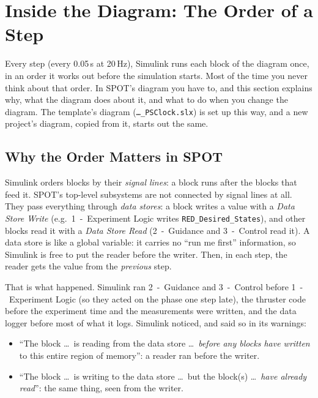 \documentclass[11pt,a4paper]{article}
\newcommand{\pth}[1]{\texttt{#1}}
\newcommand{\fn}[1]{\texttt{#1}}
\begin{document}
\section{Inside the Diagram: The Order of a Step}\label{sec:order}

Every step (every 0.05\,s at 20\,Hz), Simulink runs each block of the diagram once, in an order it works out
before the simulation starts. Most of the time you never think about that order. In SPOT's diagram you have to,
and this section explains why, what the diagram does about it, and what to do when you change the diagram.
The template's diagram (\pth{\ldots\_PSClock.slx}) is set up this way, and a new project's diagram, copied
from it, starts out the same.

\subsection{Why the Order Matters in SPOT}
Simulink orders blocks by their \emph{signal lines}: a block runs after the blocks that feed it. SPOT's
top-level subsystems are not connected by signal lines at all. They pass everything through
\emph{data stores}: a block writes a value with a \emph{Data Store Write} (e.g.\ 1~-~Experiment Logic writes
\fn{RED\_Desired\_States}), and other blocks read it with a \emph{Data Store Read} (2~-~Guidance and
3~-~Control read it). A data store is like a global variable: it carries no ``run me first'' information, so
Simulink is free to put the reader before the writer. Then, in each step, the reader gets the value from the
\emph{previous} step.

That is what happened. Simulink ran 2~-~Guidance and 3~-~Control before 1~-~Experiment Logic (so they acted on
the phase one step late), the thruster code before the experiment time and the measurements were written, and
the data logger before most of what it logs. Simulink noticed, and said so in its warnings:
\begin{itemize}
  \item ``The block \ldots\ is reading from the data store \ldots\ \emph{before any blocks have written} to this
        entire region of memory'': a reader ran before the writer.
  \item ``The block \ldots\ is writing to the data store \ldots\ but the block(s) \ldots\ \emph{have already
        read}'': the same thing, seen from the writer.
\end{itemize}
\end{document}

